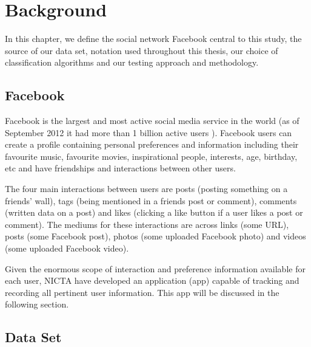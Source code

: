 
\chapter{Background}
\label{cha:back}

In this chapter, we define the social network Facebook central to this study, the source of our data set, notation used throughout 
this thesis, our choice of classification algorithms and our testing approach and methodology.

\section{Facebook}
\label{sec:data}

Facebook is the largest and most active social media service in the world (as of September 2012 it had more than 1 billion active users \cite{fbsize}).
Facebook users can create a profile containing personal preferences and information including their favourite music, favourite movies, 
inspirational people, interests, age, birthday, etc and have friendships and interactions between other users. 

The four main interactions between users are posts (posting something on a friends' wall), 
tags (being mentioned in a friends post or comment), comments (written data on a post) and likes (clicking a like button if a user 
likes a post or comment). The mediums for these interactions are across links (some URL), posts (some Facebook post), 
photos (some uploaded Facebook photo) and videos (some uploaded Facebook video).

Given the enormous scope of interaction and preference information available for each user, NICTA have developed an application (app) capable of tracking 
and recording all pertinent user information. This app will be discussed in the following section.


\section{Data Set}
\label{sec:linkr}


